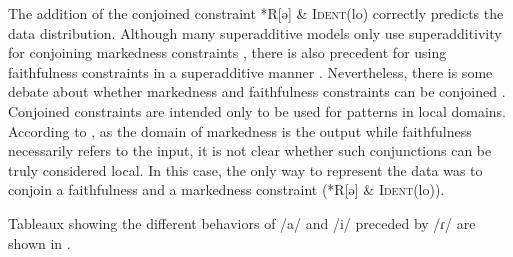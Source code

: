 \documentclass[output=paper,newtxmath,modfonts,nonflat,draftmode]{langsci/langscibook}
\begin{document}
The addition of the conjoined constraint *R[ə] \& \textsc{Ident}(lo) correctly predicts the data distribution. Although many superadditive models only use superadditivity for conjoining markedness constraints \citep{AlbrightEtAl2008}, there is also precedent for using faithfulness constraints in a superadditive manner \citep{GreenDavis2014}. Nevertheless, there is some debate about whether markedness and faithfulness constraints can be conjoined \citep{MoretonSmolensky2002}. Conjoined constraints are intended only to be used for patterns in local domains. According to \citet{MoretonSmolensky2002}, as the domain of markedness is the output while faithfulness necessarily refers to the input, it is not clear whether such conjunctions can be truly considered local. In this case, the only way to represent the data was to conjoin a faithfulness and a markedness constraint (*R[ə] \& \textsc{Ident}(lo)). 

Tableaux showing the different behaviors of /a/ and /i/ preceded by /ɾ/ are shown in .

\begin{table}
\small
\caption{Tableau for /Ri\#C/ with sample phrase ‘hair covers’, $n=192$}
\label{tab:baird:5}
\end{table}
\end{document}
